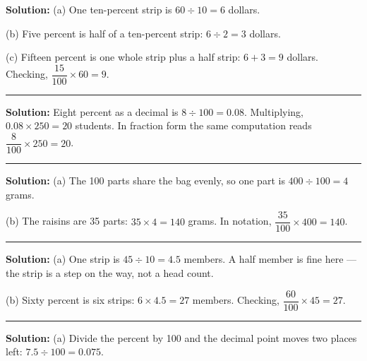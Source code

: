 \documentclass[12pt]{article}
\begin{document}
\textbf{Solution:} (a) One ten-percent strip is $60 \div 10 = 6$
dollars. 

(b) Five percent is half of a ten-percent strip: $6 \div 2 = 3$
dollars. 

(c) Fifteen percent is one whole strip plus a half strip:
$6 + 3 = 9$ dollars. Checking, $\dfrac{15}{100} \times 60 = 9$. 

\vspace{0.3cm}\noindent\rule{\linewidth}{0.2pt}\vspace{0.3cm}


\textbf{Solution:} Eight percent as a decimal is $8 \div 100 = 0.08$.
Multiplying, $0.08 \times 250 = 20$ students. In fraction form the same
computation reads $\dfrac{8}{100} \times 250 = 20$. 

\vspace{0.3cm}\noindent\rule{\linewidth}{0.2pt}\vspace{0.3cm}


\textbf{Solution:} (a) The 100 parts share the bag evenly, so one part is
$400 \div 100 = 4$ grams. 

(b) The raisins are 35 parts: $35 \times 4 = 140$ grams. In notation,
$\dfrac{35}{100} \times 400 = 140$. 

\vspace{0.3cm}\noindent\rule{\linewidth}{0.2pt}\vspace{0.3cm}


\textbf{Solution:} (a) One strip is $45 \div 10 = 4.5$ members. A half member
is fine here --- the strip is a step on the way, not a head count. 

(b) Sixty percent is six strips: $6 \times 4.5 = 27$ members. Checking,
$\dfrac{60}{100} \times 45 = 27$. 

\vspace{0.3cm}\noindent\rule{\linewidth}{0.2pt}\vspace{0.3cm}


\textbf{Solution:} (a) Divide the percent by 100 and the decimal point moves
two places left: $7.5 \div 100 = 0.075$. 
\end{document}
